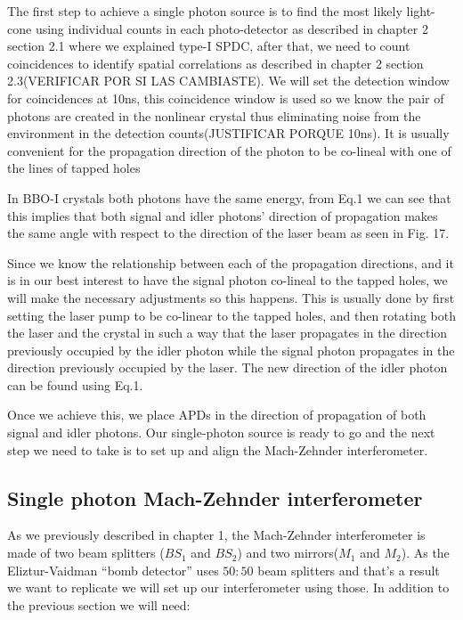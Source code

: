 \documentclass[12pt]{book}
\begin{document}
The first step to achieve a single photon source is to find the most likely light-cone using individual counts in each photo-detector as described in chapter 2 section 2.1 where we explained type-I SPDC, after that, we need to count coincidences to identify spatial correlations as described in chapter 2 section 2.3(VERIFICAR POR SI LAS CAMBIASTE). We will set the detection window for coincidences at 10ns, this coincidence window is used so we know the pair of photons are created in the nonlinear crystal thus eliminating noise from the environment in the detection counts(JUSTIFICAR PORQUE 10ns). It is usually convenient for the propagation direction of the photon to be co-lineal with one of the lines of tapped holes

In BBO-I crystals both photons have the same energy, from Eq.1 we can see that this implies that both signal and idler photons' direction of propagation makes the same angle with respect to the direction of the laser beam as seen in Fig. 17.

Since we know the relationship between each of the propagation directions, and it is in our best interest to have the signal photon co-lineal to the tapped holes, we will make the necessary adjustments so this happens. This is usually done by first setting the laser pump to be co-linear to the tapped holes, and then rotating both the laser and the crystal in such a way that the laser propagates in the direction previously occupied by the idler photon while the signal photon propagates in the direction previously occupied by the laser. The new direction of the idler photon can be found using Eq.1.

Once we achieve this, we place APDs in the direction of propagation of both signal and idler photons. Our single-photon source is ready to go and the next step we need to take is to set up and align the Mach-Zehnder interferometer.

\subsection{Single photon Mach-Zehnder interferometer}

As we previously described in chapter 1, the Mach-Zehnder interferometer is made of two beam splitters ($BS_{1}$ and $BS_{2}$) and two mirrors($M_{1}$ and $M_{2}$). As the Eliztur-Vaidman ``bomb detector'' uses $50:50$ beam splitters and that's a result we want to replicate we will set up our interferometer using those. In addition to the previous section we will need:
\end{document}
